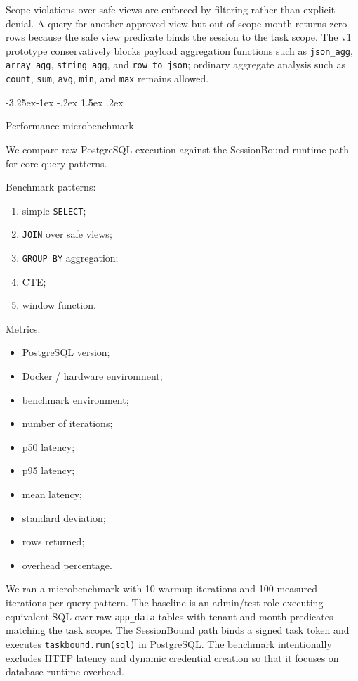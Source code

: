 \documentclass[10pt,twocolumn]{article}
\makeatletter
\providecommand{\tightlist}{%
  \setlength{\itemsep}{0pt}\setlength{\parskip}{0pt}}
\renewcommand\subsection{\@startsection{subsection}{2}{\z@}%
  {-3.25ex\@plus -1ex \@minus -.2ex}%
  {1.5ex \@plus .2ex}%
  {\normalfont\large\bfseries\raggedright}}
\makeatother
\begin{document}
Scope violations over safe views are enforced by filtering rather than
explicit denial. A query for another approved-view but out-of-scope
month returns zero rows because the safe view predicate binds the
session to the task scope. The v1 prototype conservatively blocks
payload aggregation functions such as \texttt{json\_agg},
\texttt{array\_agg}, \texttt{string\_agg}, and \texttt{row\_to\_json};
ordinary aggregate analysis such as \texttt{count}, \texttt{sum},
\texttt{avg}, \texttt{min}, and \texttt{max} remains allowed.

\hypertarget{performance-microbenchmark}{%
\subsection{Performance
microbenchmark}\label{performance-microbenchmark}}

We compare raw PostgreSQL execution against the SessionBound runtime
path for core query patterns.

Benchmark patterns:

\begin{enumerate}
\def\labelenumi{\arabic{enumi}.}
\tightlist
\item
  simple \texttt{SELECT};
\item
  \texttt{JOIN} over safe views;
\item
  \texttt{GROUP\ BY} aggregation;
\item
  CTE;
\item
  window function.
\end{enumerate}

Metrics:

\begin{itemize}
\tightlist
\item
  PostgreSQL version;
\item
  Docker / hardware environment;
\item
  benchmark environment;
\item
  number of iterations;
\item
  p50 latency;
\item
  p95 latency;
\item
  mean latency;
\item
  standard deviation;
\item
  rows returned;
\item
  overhead percentage.
\end{itemize}

We ran a microbenchmark with 10 warmup iterations and 100 measured
iterations per query pattern. The baseline is an admin/test role
executing equivalent SQL over raw
\texttt{app\_data} tables with tenant and month predicates matching the
task scope. The SessionBound path binds a signed task token and executes
\texttt{taskbound.run(sql)} in PostgreSQL. The benchmark intentionally
excludes HTTP latency and dynamic credential creation so that it focuses
on database runtime overhead.
\end{document}
